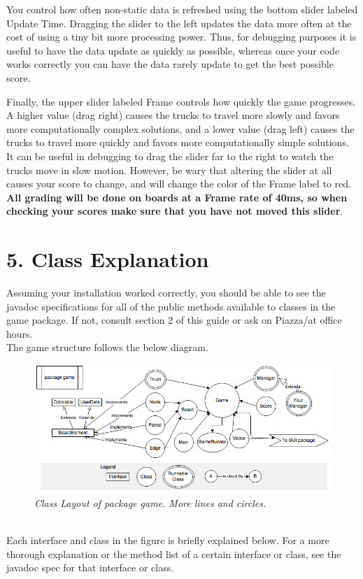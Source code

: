 \documentclass[11pt]{article}
\begin{document}
You control how often non-static data is refreshed using the bottom slider labeled Update Time. Dragging the slider to the left updates the data more often at the cost of using a tiny bit more processing power. Thus, for debugging purposes it is useful to have the data update as quickly as possible, whereas once your code works correctly you can have the data rarely update to get the best possible score.

Finally, the upper slider labeled Frame controls how quickly the game progresses. A higher value (drag right) causes the trucks to travel more slowly and favors more computationally complex solutions, and a lower value (drag left) causes the trucks to travel more quickly and favors more computationally simple solutions. It can be useful in debugging to drag the slider far to the right to watch the trucks move in slow motion. However, be wary that altering the slider at all causes your score to change, and will change the color of the Frame label to red. \textbf{All grading will be done on boards at a Frame rate of 40ms, so when checking your scores make sure that you have not moved this slider}.

\newpage
\section{5. Class Explanation}
Assuming your installation worked correctly, you should be able to see the javadoc specifications for all of the public methods available to classes in the game package. If not, consult section 2 of this guide or ask on Piazza/at office hours.\\
The game structure follows the below diagram.
\begin{figure}[h]
\centerline{\includegraphics[scale=0.7]{hirearchy.png}} 
\caption{\em{Class Layout of package game. More lines and circles.}}
\end{figure}
\\Each interface and class in the figure is briefly explained below. For a more thorough  explanation or the method list of a certain interface or class, see the javadoc spec for that interface or class.
\end{document}
